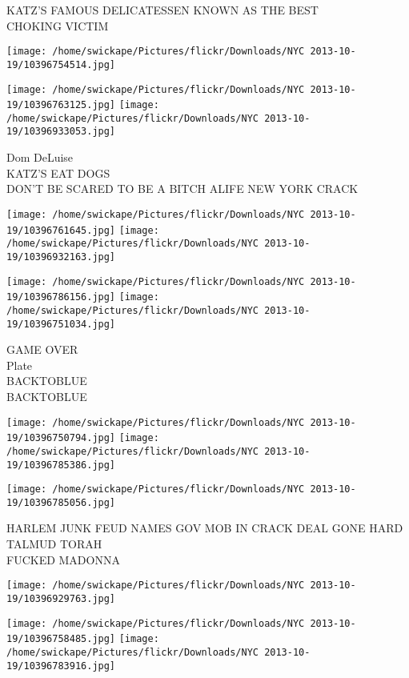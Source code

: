 \documentclass[10pt,letterpaper]{article}
\begin{document}
KATZ'S FAMOUS DELICATESSEN KNOWN AS THE BEST\\
CHOKING VICTIM
\pagebreak

\texttt{[image: /home/swickape/Pictures/flickr/Downloads/NYC 2013-10-19/10396754514.jpg]}

\vspace{0.25in}
\texttt{[image: /home/swickape/Pictures/flickr/Downloads/NYC 2013-10-19/10396763125.jpg]}
\texttt{[image: /home/swickape/Pictures/flickr/Downloads/NYC 2013-10-19/10396933053.jpg]}

Dom DeLuise\\
KATZ'S EAT DOGS\\
DON'T BE SCARED TO BE A BITCH ALIFE NEW YORK CRACK
\pagebreak

\texttt{[image: /home/swickape/Pictures/flickr/Downloads/NYC 2013-10-19/10396761645.jpg]}
\texttt{[image: /home/swickape/Pictures/flickr/Downloads/NYC 2013-10-19/10396932163.jpg]}

\texttt{[image: /home/swickape/Pictures/flickr/Downloads/NYC 2013-10-19/10396786156.jpg]}
\texttt{[image: /home/swickape/Pictures/flickr/Downloads/NYC 2013-10-19/10396751034.jpg]}

GAME OVER\\
Plate\\
BACKTOBLUE\\
BACKTOBLUE
\pagebreak

\texttt{[image: /home/swickape/Pictures/flickr/Downloads/NYC 2013-10-19/10396750794.jpg]}
\texttt{[image: /home/swickape/Pictures/flickr/Downloads/NYC 2013-10-19/10396785386.jpg]}

\vspace{0.25in}
\texttt{[image: /home/swickape/Pictures/flickr/Downloads/NYC 2013-10-19/10396785056.jpg]}

HARLEM JUNK FEUD NAMES GOV MOB IN CRACK DEAL GONE HARD\\
TALMUD TORAH\\
FUCKED MADONNA
\pagebreak

\texttt{[image: /home/swickape/Pictures/flickr/Downloads/NYC 2013-10-19/10396929763.jpg]}

\vspace{0.25in}
\texttt{[image: /home/swickape/Pictures/flickr/Downloads/NYC 2013-10-19/10396758485.jpg]}
\texttt{[image: /home/swickape/Pictures/flickr/Downloads/NYC 2013-10-19/10396783916.jpg]}
\end{document}
